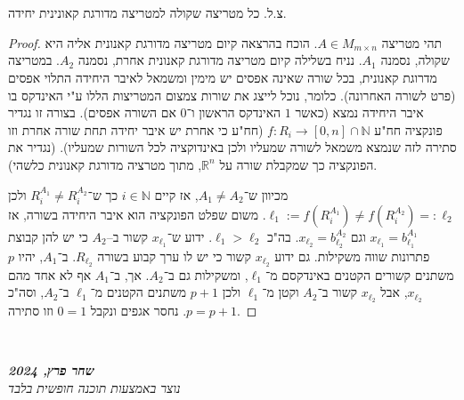 \documentclass[]{article}
\newcommand\ndoc  {\dotfill \\ \vfil {\begin{center} {\textbf{\textit{שחר פרץ, 2024}} \\ \scriptsize \textit{נוצר באמצעות תוכנה חופשית בלבד}} \end{center}} \vfil	}
\newcommand\N     {\mathbb{N}}
\newcommand\R     {\mathbb{R}}
\newcommand\co        {\colon}
\newcommand\mat[2]    {M_{#1\times#2}}
\begin{document}
	\section{}
	צ.ל. כל מטריצה שקולה למטריצה מדורגת קאונינית יחידה. 
	\begin{proof}
		תהי מטריצה $A \in \mat{m}{n}$. הוכח בהרצאה קיום מטריצה מדורגת קאנונית אליה היא שקולה, נסמנה $A_1$. נניח בשלילה קיום מטריצה מדורגת קאנונית אחרת, נסמנה $A_2$. במטריצה מדרוגת קאנונית, בכל שורה שאינה אפסים יש מימין ומשמאל לאיבר היחידה התלוי אפסים (פרט לשורה האחרונה). כלומר, נוכל לייצג את שורות צמצום המטריצות הללו ע"י האינדקס בו איבר היחידה נמצא (כאשר $1$ האינדקס הראשון ו־$0$ אם השורה אפסים). בצורה זו נגדיר פונקציה חח"ע $f \co R_i \to [0, n] \cap \N$ (חח"ע כי אחרת יש איבר יחידה תחת שורה אחרת וזו סתירה לזה שנמצא משמאל לשורה שמעליו ולכן באינדוקציה לכל השורות שמעליו). (נגדיר את הפונקציה כך שמקבלת שורה על $\R^n$, מתוך מטרציה מדורגת קאנונית כלשהי). 
		
		מכיוון ש־$A_1 \neq A_2$, אז קיים $i \in \N$ כך ש־$R^{A_1}_i \neq R^{A_2}_i$ ולכן $\ell_1 := f(R^{A_1}_i) \neq f(R^{A_2}_i)=:\ell_2$. משום שפלט הפונקציה הוא איבר היחידה בשורה, אז $x_{\ell_1} = b^{A_1}_{\ell_1}$ וגם $x_{\ell_2} = b^{A_2}_{\ell_2}$. בה"כ $\ell_1 > \ell_2$. ידוע ש־$x_{\ell_1}$ קשור ב–$A_2$ כי יש להן קבוצת פתרונות שווה משקילות. גם ידוע $x_{\ell_2}$ קשור כי יש לו ערך קבוע בשורה $R_{\ell_2}$. ב־$A_1$, יהיו $p$ משתנים קשורים הקטנים באינדקסם מ־$\ell_1$, ומשקילות גם ב־$A_2$. אך, ב־$A_1$ אף לא אחד מהם $x_{\ell_2}$, אבל $x_{\ell_2}$ קשור ב־$A_2$ וקטן מ־$\ell_1$ ולכן $p + 1$ משתנים הקטנים מ־$\ell_1$ ב־$A_2$, וסה"כ $p = p + 1$. נחסר אגפים ונקבל $0 = 1$ וזו סתירה. 
	\end{proof}
	
	\ndoc
	
\end{document}
